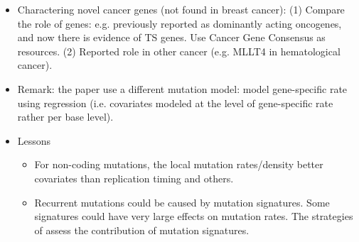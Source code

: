 \documentclass{report}
\begin{document}
\begin{itemize}
	\item Charactering novel cancer genes (not found in breast cancer): (1) Compare the role of genes: e.g. previously reported as dominantly acting oncogenes, and now there is evidence of TS genes. Use Cancer Gene Consensus as resources. (2) Reported role in other cancer (e.g. MLLT4 in hematological cancer).
	
	\item Remark: the paper use a different mutation model: model gene-specific rate using regression (i.e. covariates modeled at the level of gene-specific rate rather per base level).
	
	\item Lessons
	\begin{itemize}
		\item For non-coding mutations, the local mutation rates/density better covariates than replication timing and others.
		\item Recurrent mutations could be caused by mutation signatures. Some signatures could have very large effects on mutation rates. The strategies of assess the contribution of mutation signatures.
	\end{itemize}
\end{itemize}
\end{document}
